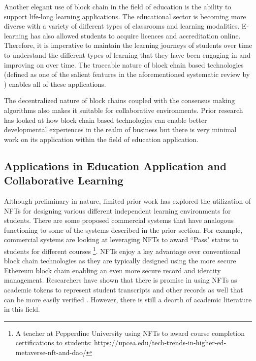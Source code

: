 \documentclass[acmsmall,nonacm]{acmart}
\begin{document}
Another elegant use of block chain in the field of education is the ability to support life-long learning applications. The educational sector is becoming more diverse with a variety of different types of classrooms and learning modalities. E-learning has also allowed students to acquire licences and accreditation online. Therefore, it is imperative to maintain the learning journeys of students over time to understand the different types of learning that they have been engaging in and improving on over time. The traceable nature of block chain based technologies (defined as one of the salient features in the aforementioned systematic review by \cite{yumna2019use}) enables all of these applications.

The decentralized nature of block chains coupled with the consensus making algorithms also makes it suitable for collaborative environments. Prior research has looked at how block chain based technologies can enable better developmental experiences in the realm of business \cite{garcia2020using} but there is very minimal work on its application within the field of education application\cite{bucea2021blockchain}. 

\subsection{Applications in Education Application and Collaborative Learning}

Although preliminary in nature, limited prior work has explored the utilization of NFTs for designing various different independent learning environments for students. There are some proposed commercial systems that have analogous functioning to some of the systems described in the prior section. For example, commercial systems are looking at leveraging NFTs to award ``Pass" status to students for different courses \footnote{A teacher at Pepperdine University using NFTs to award course completion certifications to students: https://upcea.edu/tech-trends-in-higher-ed-metaverse-nft-and-dao/}. NFTs enjoy a key advantage over conventional block chain technologies as they are typically designed using the more secure Ethereum block chain enabling an even more secure record and identity management. Researchers have shown that there is promise in using NFTs as academic tokens to represent student transcripts and other records as well that can be more easily verified \cite{elmessiry2021nft}. However, there is still a dearth of academic literature in this field.
\end{document}
